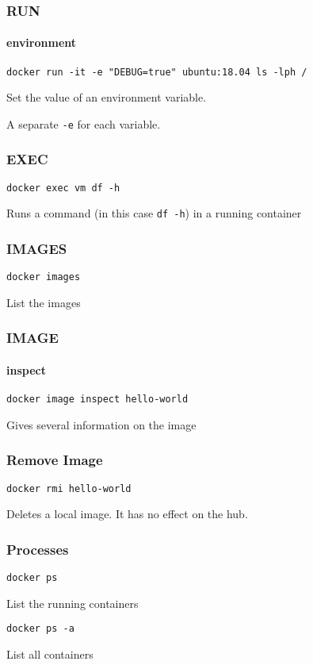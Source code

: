 \begin{frame}[fragile]
\frametitle{RUN}
\framesubtitle{environment}
\begin{lstlisting}
docker run -it -e "DEBUG=true" ubuntu:18.04 ls -lph /
\end{lstlisting}

Set the value of an environment variable.

A separate \lstinline!-e! for each variable.
\end{frame}

\begin{frame}[fragile]
\frametitle{EXEC}
\begin{lstlisting}
docker exec vm df -h
\end{lstlisting}

Runs a command (in this case \lstinline!df -h!) in a running container
\end{frame}


\begin{frame}[fragile]
\frametitle{IMAGES}
\begin{lstlisting}
docker images
\end{lstlisting}

List the images 
\end{frame}

\begin{frame}[fragile]
\frametitle{IMAGE}
\framesubtitle{inspect}
\begin{lstlisting}
docker image inspect hello-world
\end{lstlisting}

Gives several information on the image
\end{frame}


\begin{frame}[fragile]
\frametitle{Remove Image}
\begin{lstlisting}
docker rmi hello-world
\end{lstlisting}

Deletes a local image. It has no effect on the hub.
\end{frame}

\begin{frame}[fragile]
\frametitle{Processes}
\begin{lstlisting}
docker ps
\end{lstlisting}
List the running containers 
\begin{lstlisting}
docker ps -a
\end{lstlisting}
List all containers 
\end{frame}

